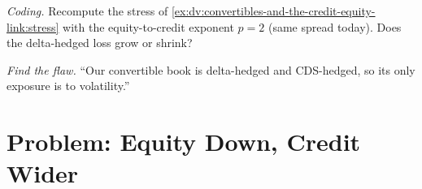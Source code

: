 \begin{exercise}[$\star\star\star$]\label{exo:dv:convertibles-and-the-credit-equity-link:7}
\emph{Coding.} Recompute the stress of \cref{ex:dv:convertibles-and-the-credit-equity-link:stress} with the equity-to-credit exponent $p=2$ (same
spread today). Does the delta-hedged loss grow or shrink?
\end{exercise}

\begin{exercise}[$\star\star\star$]\label{exo:dv:convertibles-and-the-credit-equity-link:8}
\emph{Find the flaw.} ``Our convertible book is delta-hedged and CDS-hedged, so its only exposure is to volatility.''
\end{exercise}

\section{Problem: Equity Down, Credit Wider}

